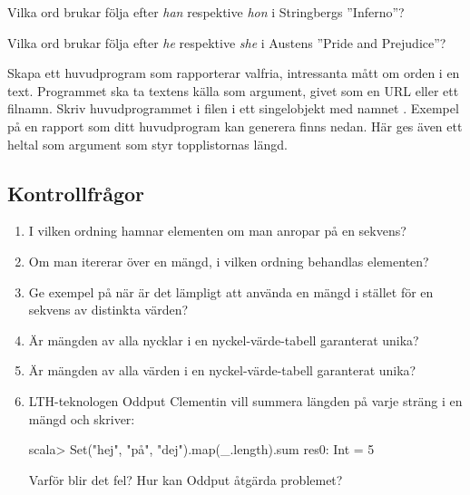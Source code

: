 \Subtask Vilka ord brukar följa efter \emph{han} respektive \emph{hon} i Stringbergs ''Inferno''?

\Subtask Vilka ord brukar följa efter \emph{he} respektive \emph{she} i Austens ''Pride and Prejudice''?


\Task Skapa ett huvudprogram som rapporterar valfria, intressanta mått om orden i en text. Programmet ska ta textens källa som argument, givet som en URL eller ett filnamn. Skriv huvudprogrammet i filen  i ett singelobjekt med namnet . Exempel på en rapport som ditt huvudprogram kan generera finns nedan. Här ges även ett heltal som argument som styr topplistornas längd.




\subsection{Kontrollfrågor}

\begin{enumerate}
\item I vilken ordning hamnar elementen om man anropar  på en sekvens?

\item Om man itererar över en mängd, i vilken ordning behandlas elementen? 

\item Ge exempel på när är det lämpligt att använda en mängd i stället för en sekvens av distinkta värden?

\item Är mängden av alla nycklar i en nyckel-värde-tabell garanterat unika?

\item Är mängden av alla värden i en nyckel-värde-tabell garanterat unika?

\item LTH-teknologen Oddput Clementin vill summera längden på varje sträng i en mängd och skriver:
\begin{REPL}
scala> Set("hej", "på", "dej").map(_.length).sum
res0: Int = 5
\end{REPL}
Varför blir det fel? Hur kan Oddput åtgärda problemet?
\end{enumerate}

